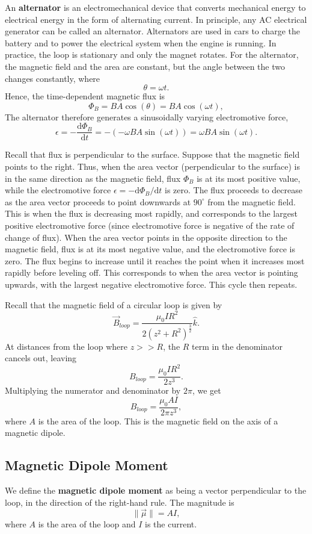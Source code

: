 \documentclass[11pt]{article}
\theoremstyle{plain} %
\theoremstyle{definition}
\theoremstyle{example}
\theoremstyle{remark}
\begin{document}
An \textbf{alternator} is an electromechanical device that converts mechanical energy to electrical energy in the form of alternating current. In principle, any AC electrical generator can be called an alternator. Alternators are used in cars to charge the battery and to power the electrical system when the engine is running. In practice, the loop is stationary and only the magnet rotates. For the alternator, the magnetic field and the area are constant, but the angle between the two changes constantly, where 
$$\theta = \omega t.$$
Hence, the time-dependent magnetic flux is 
$$\Phi_B = BA\cos(\theta) = BA\cos(\omega t),$$
The alternator therefore generates a sinusoidally varying electromotive force,
$$\epsilon =- \frac{\mathrm d \Phi_B}{\mathrm d t} = -(-\omega BA\sin(\omega t)) = \omega BA\sin(\omega t).$$

Recall that flux is perpendicular to the surface. Suppose that the magnetic field points to the right. Thus, when the area vector (perpendicular to the surface) is in the same direction as the magnetic field, 
flux $\Phi_B$ is at its most positive value, while the electromotive force $\epsilon =-\mathrm d \Phi_B/\mathrm d t$ is zero. The flux proceeds to decrease as the area vector proceeds to point downwards at $90^{\circ}$ from the magnetic field. This is when the flux is decreasing most rapidly, and corresponds to the largest positive electromotive force (since electromotive force is negative of the rate of change of flux). When the area vector points in the opposite direction to the magnetic field, flux is at its most negative value, and the electromotive force is zero. The flux begins to increase until it reaches the point when it increases most rapidly before leveling off. This corresponds to when the area vector is pointing upwards, with the largest negative electromotive force. This cycle then repeats. 

Recall that the magnetic field of a circular loop is given by $$\vec{B}_{loop} = \frac{\mu_0IR^2}{2\left(z^2+R^2\right)^{\frac{3}{2}}}\hat k.$$
At distances from the loop where $z>>R$, the $R$ term in the denominator cancels out, leaving 
$$B_{loop} = \frac{\mu_0IR^2}{2z^3}.$$
Multiplying the numerator and denominator by $2\pi$, we get 
$$B_{loop} = \frac{\mu_0AI}{2\pi z^3},$$
where $A$ is the area of the loop. This is the magnetic field on the axis of a magnetic dipole. 

\subsection{Magnetic Dipole Moment}
We define the \textbf{magnetic dipole moment} as being a vector perpendicular to the loop, in the direction of the right-hand rule. The magnitude is 
$$\|\vec{\mu}\| = AI,$$
where $A$ is the area of the loop and $I$ is the current. 
\end{document}
